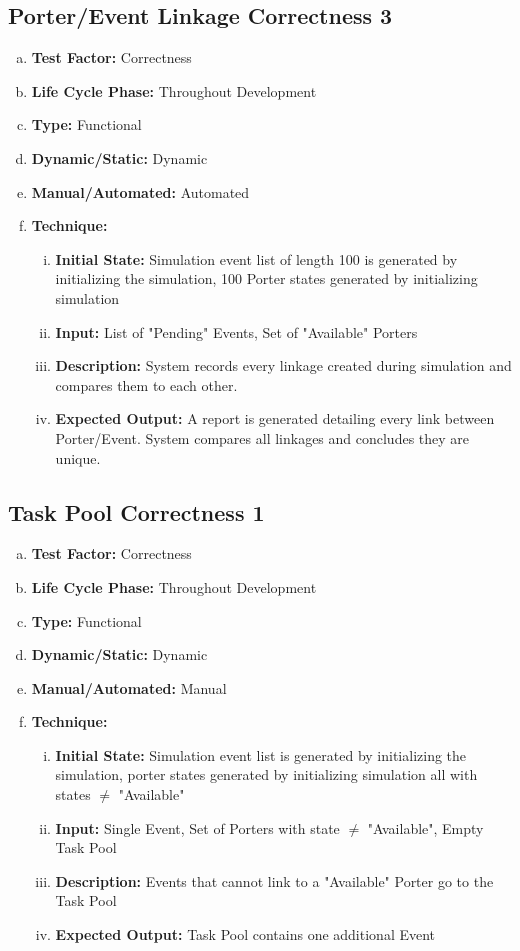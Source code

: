 \documentclass[paper=letter, fontsize=10pt]{scrartcl}
\numberwithin{equation}{section}		%
\numberwithin{figure}{section}			%
\numberwithin{table}{section}				%
\begin{document}
\subsection{Porter/Event Linkage Correctness 3}
\begin{enumerate}[(a)] 	
	\item \textbf{Test Factor:} Correctness 
	\item \textbf{Life Cycle Phase:} Throughout Development
	\item \textbf{Type:} Functional
	\item \textbf{Dynamic/Static:} Dynamic
	\item \textbf{Manual/Automated:} Automated
	\item \textbf{Technique:}
		\begin{enumerate}[(i)]
			\item \textbf{Initial State:} Simulation event list of length 100 is generated by initializing the simulation, 100 Porter states generated by initializing simulation
			\item \textbf{Input:} List of "Pending" Events, Set of "Available" Porters
			\item \textbf{Description:} System records every linkage created during simulation and compares them to each other.
			\item \textbf{Expected Output:} A report is generated detailing every link between Porter/Event. System compares all linkages and concludes they are unique.
		\end{enumerate}
\end{enumerate}

\subsection{Task Pool Correctness 1}
\begin{enumerate}[(a)]
	\item \textbf{Test Factor:} Correctness
	\item \textbf{Life Cycle Phase:} Throughout Development
	\item \textbf{Type:} Functional
	\item \textbf{Dynamic/Static:} Dynamic
	\item \textbf{Manual/Automated:} Manual
	\item \textbf{Technique:}
		\begin{enumerate}[(i)]
			\item \textbf{Initial State:} Simulation event list is generated by initializing the simulation, porter states generated by initializing simulation all with states $\neq$ "Available"
			\item \textbf{Input:} Single Event, Set of Porters with state $\neq$ "Available", Empty Task Pool
			\item \textbf{Description:} Events that cannot link to a "Available" Porter go to the Task Pool
			\item \textbf{Expected Output:} Task Pool contains one additional Event 
		\end{enumerate}
\end{enumerate}
\end{document}

